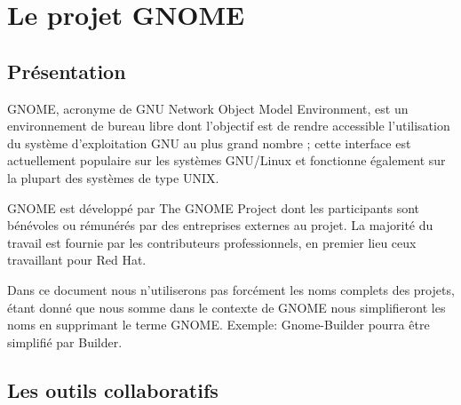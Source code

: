 \documentclass[12pt]{report}
\begin{document}



\chapter{Le projet GNOME}
\section{Présentation}
GNOME, acronyme de GNU Network Object Model Environment, est un
environnement de bureau libre  dont l'objectif est de rendre
accessible l'utilisation du système d'exploitation GNU au plus grand
nombre ; cette interface est actuellement populaire sur les systèmes
GNU/Linux et fonctionne également sur la plupart des systèmes de type
UNIX.

GNOME est développé par The GNOME Project dont les participants sont
bénévoles ou rémunérés par des entreprises externes au projet. La
majorité du travail est fournie par les contributeurs professionnels,
en premier lieu ceux travaillant pour Red Hat.

Dans ce document nous n'utiliserons pas forcément les noms complets des
projets, étant donné que nous somme dans le contexte de GNOME nous
simplifieront les noms en supprimant le terme GNOME.
Exemple: Gnome-Builder pourra être simplifié par Builder.

\section{Les outils collaboratifs} 
\end{document}
